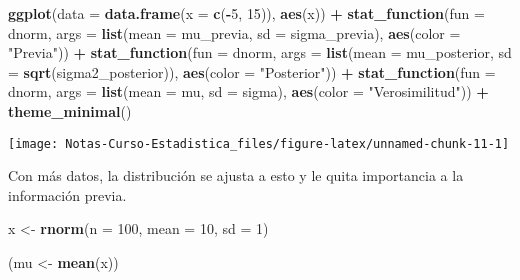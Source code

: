 \documentclass[
  12pt,
]{book}
\newenvironment{Shaded}{\begin{snugshade}}{\end{snugshade}}
\newcommand{\DataTypeTok}[1]{\textcolor[rgb]{0.13,0.29,0.53}{#1}}
\newcommand{\DecValTok}[1]{\textcolor[rgb]{0.00,0.00,0.81}{#1}}
\newcommand{\KeywordTok}[1]{\textcolor[rgb]{0.13,0.29,0.53}{\textbf{#1}}}
\newcommand{\NormalTok}[1]{#1}
\newcommand{\OperatorTok}[1]{\textcolor[rgb]{0.81,0.36,0.00}{\textbf{#1}}}
\newcommand{\StringTok}[1]{\textcolor[rgb]{0.31,0.60,0.02}{#1}}
\begin{document}
\begin{Shaded}
\begin{Highlighting}[]
\KeywordTok{ggplot}\NormalTok{(}\DataTypeTok{data =} \KeywordTok{data.frame}\NormalTok{(}\DataTypeTok{x =} \KeywordTok{c}\NormalTok{(}\OperatorTok{{-}}\DecValTok{5}\NormalTok{, }\DecValTok{15}\NormalTok{)), }\KeywordTok{aes}\NormalTok{(x)) }\OperatorTok{+}\StringTok{ }
\StringTok{    }\KeywordTok{stat\_function}\NormalTok{(}\DataTypeTok{fun =}\NormalTok{ dnorm, }\DataTypeTok{args =} \KeywordTok{list}\NormalTok{(}\DataTypeTok{mean =}\NormalTok{ mu\_previa, }
        \DataTypeTok{sd =}\NormalTok{ sigma\_previa), }\KeywordTok{aes}\NormalTok{(}\DataTypeTok{color =} \StringTok{"Previa"}\NormalTok{)) }\OperatorTok{+}\StringTok{ }
\StringTok{    }\KeywordTok{stat\_function}\NormalTok{(}\DataTypeTok{fun =}\NormalTok{ dnorm, }\DataTypeTok{args =} \KeywordTok{list}\NormalTok{(}\DataTypeTok{mean =}\NormalTok{ mu\_posterior, }
        \DataTypeTok{sd =} \KeywordTok{sqrt}\NormalTok{(sigma2\_posterior)), }\KeywordTok{aes}\NormalTok{(}\DataTypeTok{color =} \StringTok{"Posterior"}\NormalTok{)) }\OperatorTok{+}\StringTok{ }
\StringTok{    }\KeywordTok{stat\_function}\NormalTok{(}\DataTypeTok{fun =}\NormalTok{ dnorm, }\DataTypeTok{args =} \KeywordTok{list}\NormalTok{(}\DataTypeTok{mean =}\NormalTok{ mu, }
        \DataTypeTok{sd =}\NormalTok{ sigma), }\KeywordTok{aes}\NormalTok{(}\DataTypeTok{color =} \StringTok{"Verosimilitud"}\NormalTok{)) }\OperatorTok{+}\StringTok{ }
\StringTok{    }\KeywordTok{theme\_minimal}\NormalTok{()}
\end{Highlighting}
\end{Shaded}

\begin{center}\texttt{[image: Notas-Curso-Estadistica\_files/figure-latex/unnamed-chunk-11-1]} \end{center}

Con más datos, la distribución se ajusta a esto y le quita importancia a la información previa.

\begin{Shaded}
\begin{Highlighting}[]
\NormalTok{x \textless{}{-}}\StringTok{ }\KeywordTok{rnorm}\NormalTok{(}\DataTypeTok{n =} \DecValTok{100}\NormalTok{, }\DataTypeTok{mean =} \DecValTok{10}\NormalTok{, }\DataTypeTok{sd =} \DecValTok{1}\NormalTok{)}

\NormalTok{(mu \textless{}{-}}\StringTok{ }\KeywordTok{mean}\NormalTok{(x))}
\end{Highlighting}
\end{Shaded}
\end{document}

